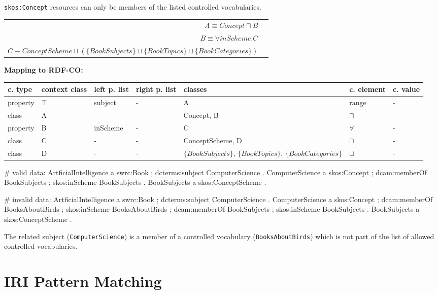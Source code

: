 \documentclass{llncs}
\newcommand{\ms}[1]{\texttt{#1}}
\newenvironment{gcotable}{
  \scriptsize
  \sffamily
  \vspace{0cm}
	\begin{center}
	\textbf{\vspace{0.4cm}Mapping to RDF-CO:} \\
  \begin{tabular}{l|l|l|l|l|l|l}
	\hline
  \textbf{c. type} & \textbf{context class} & \textbf{left p. list} & \textbf{right p. list} & \textbf{classes} & \textbf{c. element} & \textbf{c. value} \\
  \hline

}{
  \hline
  \end{tabular}
	\end{center}
}
\newenvironment{DL}{
  \vspace{0cm}
	\begin{center}
  \begin{tabular}{r l}

}{
  \end{tabular}
	\end{center}
}
\newcommand{\er}[1]{\todo[size=\small, color=red!40]{\textbf{Erman:} #1}}
\begin{document}
\ms{skos:Concept} resources can only be members of the listed controlled vocabularies.

\begin{DL}
$A \equiv Concept \sqcap B$ \\
$B \equiv \forall inScheme . C$ \\
$C \equiv ConceptScheme \sqcap ( \{BookSubjects\} \sqcup \{BookTopics\} \sqcup \{BookCategories\} )$
\end{DL}

\begin{gcotable}
property & $\top$ & subject & - & A & range & - \\
class & A & - & - & Concept, B & $\sqcap$ & - \\
property & B & inScheme & - & C & $\forall$ & - \\
class & C & - & - & ConceptScheme, D & $\sqcap$ & - \\
class & D & - & - & $\{BookSubjects\}$, $\{BookTopics\}$, $\{BookCategories\}$ & $\sqcup$ & - \\
\end{gcotable}

\begin{ex}
# valid data:
ArtficialIntelligence
    a swrc:Book ;
    dcterms:subject ComputerScience .
ComputerScience
    a skos:Concept ;
    dcam:memberOf BookSubjects ;
    skos:inScheme BookSubjects .
BookSubjects
    a skos:ConceptScheme .
\end{ex}

\begin{ex}
# invalid data:
ArtficialIntelligence
    a swrc:Book ;
    dcterms:subject ComputerScience .
ComputerScience
    a skos:Concept ;
    dcam:memberOf BooksAboutBirds ;
    skos:inScheme BooksAboutBirds ;
    dcam:memberOf BookSubjects ;
    skos:inScheme BookSubjects .
BookSubjects
    a skos:ConceptScheme .
\end{ex}

The related subject (\ms{ComputerScience}) is a member of a controlled vocabulary (\ms{BooksAboutBirds}) 
which is not part of the list of allowed controlled vocabularies.

\section{IRI Pattern Matching}
\end{document}

